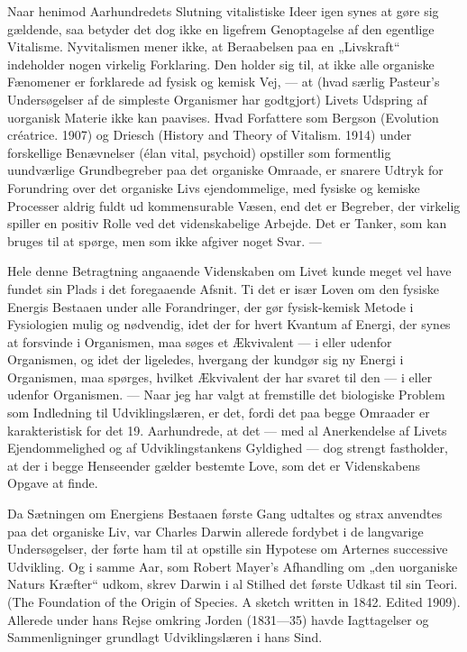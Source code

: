 \documentclass[12pt,a4paper,openany]{book}
\newcommand{\opage}[1]{\marginnote{\footnotesize\textit{[#1]}}}
\begin{document}
Naar henimod Aarhundredets Slutning vitalistiske Ideer igen synes
at gøre sig gældende, saa betyder det dog ikke en ligefrem Genoptagelse
af den egentlige Vitalisme. Nyvitalismen mener ikke, at
Beraabelsen paa en „Livskraft“ indeholder nogen virkelig Forklaring.
Den holder sig til, at ikke alle organiske Fænomener er forklarede
ad fysisk og kemisk Vej, --- at (hvad særlig Pasteur’s Undersøgelser
af de simpleste Organismer har godtgjort) Livets Udspring
af uorganisk Materie ikke kan paavises. Hvad Forfattere som Bergson
(Evolution créatrice. 1907) og Driesch (History and Theory of
Vitalism. 1914) under forskellige Benævnelser (élan vital, psychoid)
opstiller som formentlig uundværlige Grundbegreber paa det organiske
Omraade, er snarere Udtryk for Forundring over det organiske
Livs ejendommelige, med fysiske og kemiske Processer aldrig fuldt
ud kommensurable Væsen, end det er Begreber, der virkelig spiller
en positiv Rolle ved det videnskabelige Arbejde. Det er Tanker, som
kan bruges til at spørge, men som ikke afgiver noget Svar. ---

Hele denne Betragtning angaaende Videnskaben om Livet kunde
meget vel have fundet sin Plads i det foregaaende Afsnit. Ti det er
\opage{35}især Loven om den fysiske Energis Bestaaen under alle Forandringer,
der gør fysisk-kemisk Metode i Fysiologien mulig og nødvendig,
idet der for hvert Kvantum af Energi, der synes at forsvinde i
Organismen, maa søges et Ækvivalent --- i eller udenfor Organismen,
og idet der ligeledes, hvergang der kundgør sig ny Energi i
Organismen, maa spørges, hvilket Ækvivalent der har svaret til
den --- i eller udenfor Organismen. --- Naar jeg har valgt at fremstille
det biologiske Problem som Indledning til Udviklingslæren, er
det, fordi det paa begge Omraader er karakteristisk for det 19. Aarhundrede,
at det --- med al Anerkendelse af Livets Ejendommelighed
og af Udviklingstankens Gyldighed --- dog strengt fastholder, at
der i begge Henseender gælder bestemte Love, som det er Videnskabens
Opgave at finde.

Da Sætningen om Energiens Bestaaen første Gang udtaltes og
strax anvendtes paa det organiske Liv, var Charles Darwin allerede
fordybet i de langvarige Undersøgelser, der førte ham til at opstille
sin Hypotese om Arternes successive Udvikling. Og i samme Aar,
som Robert Mayer’s Afhandling om „den uorganiske Naturs Kræfter“
udkom, skrev Darwin i al Stilhed det første Udkast til sin
Teori. (The Foundation of the Origin of Species. A sketch written
in 1842. Edited 1909). Allerede under hans Rejse omkring Jorden
(1831---35) havde Iagttagelser og Sammenligninger grundlagt Udviklingslæren
i hans Sind.
\end{document}
